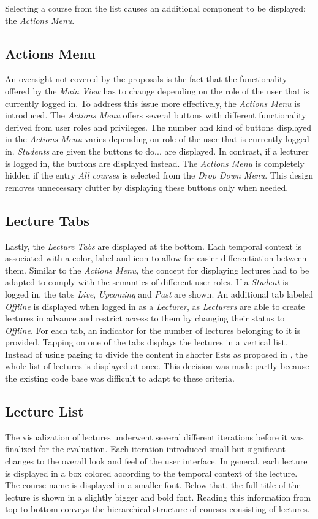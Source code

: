 Selecting a course from the list causes an additional component to be displayed: the \emph{Actions Menu}.
\subsection{Actions Menu}
An oversight not covered by the proposals is the fact that the functionality offered by the \emph{Main View} has to change depending on the role of the user that is currently logged in. To address this issue more effectively, the \emph{Actions Menu} is introduced.
The \emph{Actions Menu} offers several buttons with different functionality derived from user roles and privileges.
The number and kind of buttons displayed in the \emph{Actions Menu} varies depending on role of the user that is currently logged in. \emph{Students} are given the buttons to do... \todosct are displayed. In contrast, if a lecturer is logged in, the buttons \todoedit are displayed instead.
The \emph{Actions Menu} is completely hidden if the entry \emph{All courses} is selected from the \emph{Drop Down Menu}. This design removes unnecessary clutter by displaying these buttons only when needed.
\subsection{Lecture Tabs}
Lastly, the \emph{Lecture Tabs} are displayed at the bottom. Each temporal context is associated with a color, label and icon to allow for easier differentiation between them. Similar to the \emph{Actions Menu}, the concept for displaying lectures had to be adapted to comply with the semantics of different user roles.
If a \emph{Student} is logged in, the tabs \emph{Live}, \emph{Upcoming} and \emph{Past} are shown. An additional tab labeled \emph{Offline} is displayed when logged in as a \emph{Lecturer}, as \emph{Lecturers} are able to create lectures in advance and restrict access to them by changing their status to \emph{Offline}.
For each tab, an indicator for the number of lectures belonging to it is provided.
Tapping on one of the tabs displays the lectures in a vertical list. Instead of using paging to divide the content in shorter lists as proposed in , the whole list of lectures is displayed at once.
This decision was made partly because the existing code base was difficult to adapt to these criteria.

\subsection{Lecture List}
The visualization of lectures underwent several different iterations before it was finalized for the evaluation. Each iteration introduced small but significant changes to the overall look and feel of the user interface.
In general, each lecture is displayed in a box colored according to the temporal context of the lecture. The course name is displayed in a smaller font. Below that, the full title of the lecture is shown in a slightly bigger and bold font. Reading this information from top to bottom conveys the hierarchical structure of courses consisting of lectures. 

